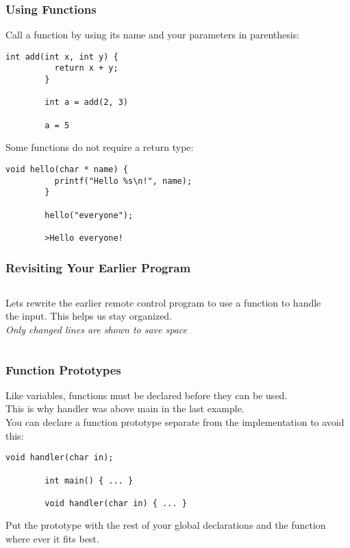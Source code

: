 \begin{frame}[fragile]
	\frametitle{Using Functions}
	Call a function by using its name and your parameters in parenthesis:
	\begin{lstlisting}[numbers=none]
		int add(int x, int y) {
		  return x + y;
		}
		
		int a = add(2, 3)
		
		a = 5
	\end{lstlisting}
	Some functions do not require a return type:
	\begin{lstlisting}[numbers=none]
		void hello(char * name) {
		  printf("Hello %s\n!", name);
		}
		
		hello("everyone");
		
		>Hello everyone!
	\end{lstlisting}
\end{frame}

\begin{frame}[fragile]
	\frametitle{Revisiting Your Earlier Program}
	\begin{columns}[T]
		\begin{column}{0.5\textwidth}
			Lets rewrite the earlier remote control program to use a function to handle the input.
			This helps us stay organized.\\
			\pause
			\vspace{2ex}
			\textit{Only changed lines are shown to save space}
		\end{column}
		\begin{column}{0.5\textwidth}
	
		\end{column}
	\end{columns}
\end{frame}

\begin{frame}[fragile]
	\frametitle{Function Prototypes}
	Like variables, functions must be declared before they can be used.\\
	This is why handler was above main in the last example.\\
	\vfill
	You can declare a function prototype separate from the implementation to avoid this:
	\begin{lstlisting}[numbers=none]
		void handler(char in);
		
		int main() { ... }
		
		void handler(char in) { ... }
	\end{lstlisting}
	Put the prototype with the rest of your global declarations and the function where ever it fits best.
\end{frame}

